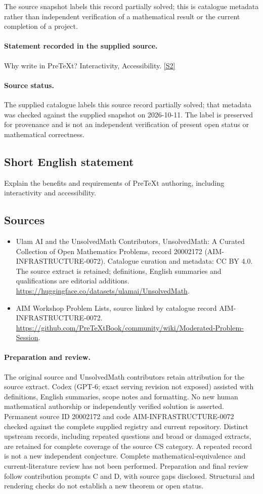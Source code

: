 \documentclass[11pt]{article}
\begin{document}
The source snapshot labels this record partially solved; this is catalogue metadata rather than independent verification of a mathematical result or the current completion of a project.
\paragraph{Statement recorded in the supplied source.}
Why write in PreTeXt? Interactivity, Accessibility. \href{https://github.com/PreTeXtBook/community/wiki/Moderated-Problem-Session}{[S2]}
\paragraph{Source status.}
The supplied catalogue labels this source record partially solved; that metadata was checked against the supplied snapshot on 2026-10-11. The label is preserved for provenance and is not an independent verification of present open status or mathematical correctness.
\subsection{Short English statement}
Explain the benefits and requirements of PreTeXt authoring, including interactivity and accessibility.
\subsection{Sources}
\begin{itemize}
\item[S1] Ulam AI and the UnsolvedMath Contributors, UnsolvedMath: A Curated Collection of Open Mathematics Problems, record 20002172 (AIM-INFRASTRUCTURE-0072). Catalogue curation and metadata: CC BY 4.0. The source extract is retained; definitions, English summaries and qualifications are editorial additions.
\url{https://huggingface.co/datasets/ulamai/UnsolvedMath}.
\item[S2] AIM Workshop Problem Lists, source linked by catalogue record AIM-INFRASTRUCTURE-0072.
\url{https://github.com/PreTeXtBook/community/wiki/Moderated-Problem-Session}.
\end{itemize}
\paragraph{Preparation and review.}
The original source and UnsolvedMath contributors retain attribution for the source extract. Codex (GPT-6; exact serving revision not exposed) assisted with definitions, English summaries, scope notes and formatting. No new human mathematical authorship or independently verified solution is asserted. Permanent source ID 20002172 and code AIM-INFRASTRUCTURE-0072 checked against the complete supplied registry and current repository. Distinct upstream records, including repeated questions and broad or damaged extracts, are retained for complete coverage of the source CS category. A repeated record is not a new independent conjecture. Complete mathematical-equivalence and current-literature review has not been performed. Preparation and final review follow contribution prompts C and D, with source gaps disclosed. Structural and rendering checks do not establish a new theorem or open status.
\label{end:20002172}
\end{document}
